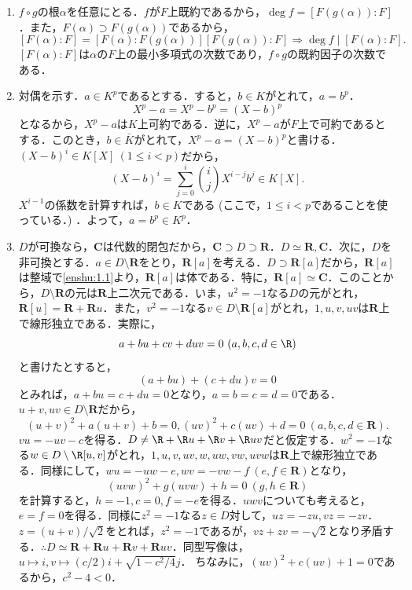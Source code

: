 \documentclass[a4paper,10pt]{ltjsarticle}
\begin{document}
\begin{enumerate}[]
  \item \label{enshu:1.13} $f \circ g$の根$\alpha$を任意にとる．$f$が$F$上既約であるから，$\deg f = [F(g(\alpha)) : F]$．また，$F(\alpha) \supset F(g(\alpha))$であるから，
  \[ [F(\alpha) : F] = [F(\alpha) : F(g(\alpha))] [F(g(\alpha)) : F] \Longrightarrow \deg f \mid [F(\alpha) : F]. \]
  $[F(\alpha) : F]$は$\alpha$の$F$上の最小多項式の次数であり，$f \circ g$の既約因子の次数である．

  \item \label{enshu:1.14} 対偶を示す．$a \in K^p$であるとする．すると，$b \in K$がとれて，$a = b^p$．
  \[ X^p - a = X^p - b^p = (X - b)^p\]
  となるから，$X^p - a$は$K$上可約である．逆に，$X^p - a$が$F$上で可約であるとする．このとき，$b \in \bar K$がとれて，$X^p - a = (X - b)^p$と書ける．$(X - b)^i \in K[X]\ (1 \le i < p)$だから，
  \[ (X - b)^i = \sum_{j = 0}^i \binom{i}{j} X^{i - j} b^{j} \in K[X]. \]
  $X^{i - 1}$の係数を計算すれば，$b \in K$である (ここで，$1 \le i < p$であることを使っている．) ．よって，$a = b^p \in K^p$．

  \item \label{enshu:1.15} $D$が可換なら，$\mathbf{C}$は代数的閉包だから，$\mathbf{C} \supset D \supset \mathbf{R}$．$D \simeq \mathbf{R}, \mathbf{C}$．次に，$D$を非可換とする．$a \in D \setminus \mathbf{R}$をとり，$\mathbf{R}[a]$を考える．$D \supset \mathbf{R}[a]$だから，$\mathbf{R}[a]$は整域で\ref{enshu:1.1}より，$\mathbf{R}[a]$は体である．特に，$\mathbf{R}[a] \simeq \mathbf{C}$．このことから，$D \setminus \mathbf{R}$の元は$\mathbf{R}$上二次元である．いま，$u^2 = -1$なる$D$の元がとれ，$\mathbf{R}[u] = \mathbf{R} + \mathbf{R}u$．また，$v^2 = -1$なる$v \in D \setminus \mathbf{R}[a]$がとれ，$1, u, v, uv$は$\mathbf{R}$上で線形独立である．実際に，
  \[ a + bu + cv + duv = 0 \ (a, b, c, d \in \R) \]
  と書けたとすると，
  \[ (a + bu) + (c + du)v = 0 \]
  とみれば，$a + bu = c + du = 0$となり，$a = b = c = d = 0$である．
  $u + v, uv \in D \setminus \mathbf{R}$だから，
  \[ (u + v)^2 + a(u + v) + b = 0, (uv)^2 + c(uv) + d = 0 \ (a, b, c, d \in \mathbf{R}). \]
  $vu = -uv - c$を得る．$D \ne \R + \R u + \R v + \R uv$だと仮定する．$w^2 = -1$なる$w \in D \setminus \R[u, v]$がとれ，$1, u, v, uv, w, uw, vw, uvw$は$\mathbf{R}$上で線形独立である．同様にして，$wu = -uw - e, wv = -vw - f \ (e, f \in \mathbf{R})$となり，
  \[ (uvw)^2 + g(uvw) + h = 0 \ (g, h \in \mathbf{R}) \]
  を計算すると，$h = -1, c = 0, f = -e$を得る．$uwv$についても考えると，$e = f = 0$を得る．同様に$z^2 = -1$なる$z \in D$対して，$uz = -zu, vz = -zv$．$z = (u + v) / \sqrt{2}$をとれば，$z^2 = -1$であるが，$vz + zv = -\sqrt{2}$となり矛盾する．$\therefore D \simeq \mathbf{R} + \mathbf{R}u + \mathbf{R}v + \mathbf{R}uv$．同型写像は，$u \mapsto i, v \mapsto (c / 2)i + \sqrt{1 - c^2 / 4}j$．
  ちなみに，$(uv)^2 + c(uv) + 1 = 0$であるから，$c^2 - 4 < 0$．


\end{enumerate}
\end{document}
